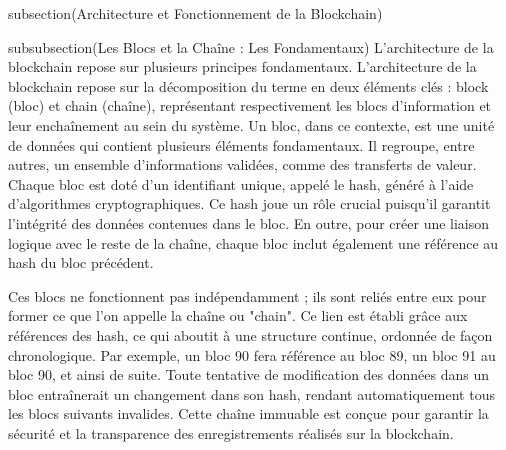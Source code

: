 
subsection(Architecture et Fonctionnement de la Blockchain)

subsubsection(Les Blocs et la Chaîne : Les Fondamentaux)
L’architecture de la blockchain repose sur plusieurs principes fondamentaux. L'architecture de la blockchain repose sur la décomposition du terme en deux éléments clés : block (bloc) et chain (chaîne), représentant respectivement les blocs d'information et leur enchaînement au sein du système. Un bloc, dans ce contexte, est une unité de données qui contient plusieurs éléments fondamentaux. Il regroupe, entre autres, un ensemble d'informations validées, comme des transferts de valeur. Chaque bloc est doté d’un identifiant unique, appelé le hash, généré à l’aide d’algorithmes cryptographiques. Ce hash joue un rôle crucial puisqu’il garantit l’intégrité des données contenues dans le bloc. En outre, pour créer une liaison logique avec le reste de la chaîne, chaque bloc inclut également une référence au hash du bloc précédent. 



Ces blocs ne fonctionnent pas indépendamment ; ils sont reliés entre eux pour former ce que l’on appelle la chaîne ou "chain". Ce lien est établi grâce aux références des hash, ce qui aboutit à une structure continue, ordonnée de façon chronologique. Par exemple, un bloc 90 fera référence au bloc 89, un bloc 91 au bloc 90, et ainsi de suite. Toute tentative de modification des données dans un bloc entraînerait un changement dans son hash, rendant automatiquement tous les blocs suivants invalides. Cette chaîne immuable est conçue pour garantir la sécurité et la transparence des enregistrements réalisés sur la blockchain.

